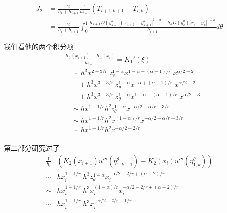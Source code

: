 \documentclass{ctexart}
\begin{document}
\begin{equation}
    \begin{aligned}
        J_2 & = \frac{2}{h_i + h_{i+1}}\frac{1}{h_{i+1}} \left(T_{i+1, k+1} -T_{i,k} \right)                                                                                                \\
            & = \frac{2}{h_i + h_{i+1}} \int_{0}^1 \frac{h_{k+1}D(y_{k+1}^\theta)|x_{i+1}-y_{k+1}^\theta|^{1-\alpha} - h_k D(y_{k}^\theta)|x_{i}-y_{k}^\theta|^{1-\alpha}}{h_{i+1}} d\theta
    \end{aligned}
\end{equation}

我们看他的两个积分项
\begin{equation}
    \begin{aligned}
         & \frac{K_1(x_{i+1}) - K_1(x_{i})}{h_{i+1}} = K_1'(\xi)                                       \\
         & \quad \sim h^3 x^{2-3/r} \; z_\theta^{1-\alpha} x^{1-\alpha+(\alpha-1)/r} \; x^{\alpha/2-2} \\
         & \qquad + h^3 x^{3-3/r} \; z_\theta^{1-\alpha} x^{-\alpha+(\alpha-1)/r} \; x^{\alpha/2-2}    \\
         & \qquad + h^3 x^{3-3/r} \; z_\theta^{1-\alpha} x^{1-\alpha+(\alpha-1)/r} \; x^{\alpha/2-3}   \\
         & \quad \sim hx^{1-1/r} h^2 z_\theta^{1-\alpha} x^{-\alpha/2+\alpha/r-3/r}                    \\
         & \quad \sim hx^{1-1/r} h^2 x^{(1-\alpha)/r} x^{-\alpha/2+\alpha/r-3/r}                       \\
         & \quad \sim hx^{1-1/r} h^2 x^{-\alpha/2-2/r}                                                 \\
    \end{aligned}
\end{equation}

第二部分研究过了
\begin{equation}
    \begin{aligned}
        \frac{1}{h_i} & (K_2(x_{i+1}) u'''(\eta_{1,k+1}^\theta) - K_2(x_{i}) u'''(\eta_{1,k}^\theta)) \\
        \sim          & hx_i^{1-1/r} \; h^3 z_\theta^{1-\alpha} x_i^{-\alpha/2-2/r+(\alpha-2)/r}      \\
        \sim          & hx_i^{1-1/r} \; h^3 x_i^{(1-\alpha)/r} x_i^{-\alpha/2-2/r+(\alpha-2)/r}       \\
        \sim          & hx_i^{1-1/r} \; h^3 x_i^{-\alpha/2-2/r-1/r}                                   \\
    \end{aligned}
\end{equation}
\end{document}
